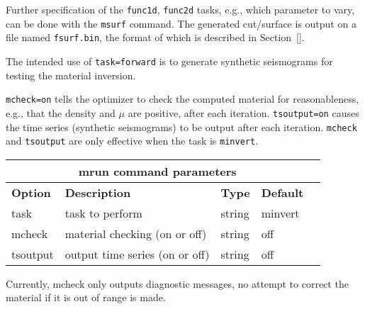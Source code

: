 \documentclass[12pt]{report}
\begin{document}
Further specification of the {\tt func1d}, {\tt func2d} tasks, e.g., which parameter to
vary, can be done with the \verb+msurf+ command. The generated cut/surface is output on
a file named {\tt fsurf.bin}, the format of which is described in Section~\ref{}.
\par
The intended use of \verb+task=forward+ is to
generate synthetic seismograms for testing the material inversion. \par
\verb+mcheck=on+ tells the optimizer to check the computed material for reasonableness, e.g.,
that the density and $\mu$ are positive, after each iteration. \verb+tsoutput=on+ causes
the time series (synthetic seismograms) to be output after each iteration.
\verb+mcheck+ and \verb+tsoutput+ are only effective when the task is \verb+minvert+.
\begin{center}
\begin{tabular}{|l|p{6cm}|l|l|l|} \hline
\multicolumn{4}{|c|}{\bf mrun command parameters}\\ \hline
{\bf Option} & {\bf Description}          & {\bf Type} & {\bf Default} \\ \hline 
\hline
task    & task to perform                 & string & minvert \\ \hline
mcheck  & material checking (on or off)   & string & off \\ \hline
tsoutput & output time series (on or off) & string & off \\ \hline
\end{tabular}
\end{center}

Currently, mcheck only outputs diagnostic messages, no attempt to correct the material if
it is out of range is made.
\end{document}
